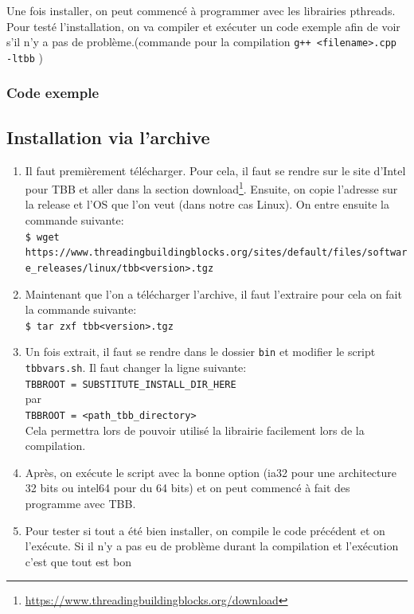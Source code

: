 \documentclass[10pt,a4paper]{article}
\begin{document}
Une fois installer, on peut commencé à programmer avec les librairies pthreads. Pour testé l'installation, on va compiler et exécuter un code exemple afin de voir s'il n'y a pas de problème.(commande pour la compilation \texttt{g++ <filename>.cpp -ltbb} )

\subsubsection{Code exemple}


\newpage

\subsection{Installation via l'archive}

\begin{enumerate}

	\item Il faut premièrement télécharger. Pour cela, il faut se rendre sur le site d'Intel pour TBB et aller dans la section download\footnote{\url{https://www.threadingbuildingblocks.org/download}}. Ensuite, on copie l'adresse sur la release et l'OS que l'on veut (dans notre cas Linux). On entre ensuite la commande suivante:\\
	\texttt{\$ wget https://www.threadingbuildingblocks.org/sites/default/files/\linebreak software\_releases/linux/tbb<version>.tgz}
	
	\item Maintenant que l'on a télécharger l'archive, il faut l'extraire pour cela on fait la commande suivante:\\
	\texttt{\$ tar zxf tbb<version>.tgz}
	\item Un fois extrait, il faut se rendre dans le dossier \texttt{bin} et modifier le script \texttt{tbbvars.sh}. Il faut changer la ligne suivante:\\
	\texttt{TBBROOT = SUBSTITUTE\_INSTALL\_DIR\_HERE} \\
	par\\
	\texttt{TBBROOT = <path\_tbb\_directory>}\\
	Cela permettra lors de pouvoir utilisé la librairie facilement lors de la compilation.
	\item Après, on exécute le script avec la bonne option (ia32 pour une architecture 32 bits ou intel64 pour du 64 bits) et on peut commencé à fait des programme avec TBB.
	\item Pour tester si tout a été bien installer, on compile le code précédent et on l'exécute.
	Si il n'y a pas eu de problème durant la compilation et l'exécution c'est que tout est bon
\end{enumerate}
\end{document}
